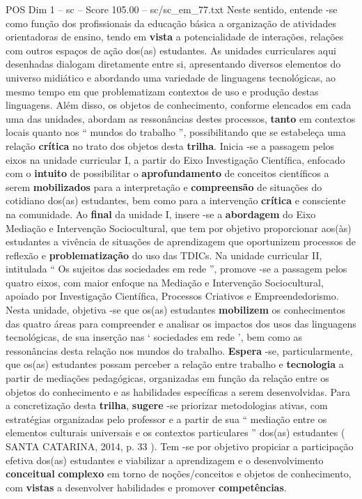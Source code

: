 \begin{textsample}{POS Dim 1 – sc – Score 105.00 – sc/sc\_em\_77.txt}
Neste sentido, entende -se como função dos profissionais da educação básica a organização de atividades orientadoras de ensino, tendo em \textbf{vista} a potencialidade de interações, relações com outros espaços de ação dos(as) estudantes.
As unidades curriculares aqui desenhadas dialogam diretamente entre si, apresentando diversos elementos do universo midiático e abordando uma variedade de linguagens tecnológicas, ao mesmo tempo em que problematizam contextos de uso e produção destas linguagens.
Além disso, os objetos de conhecimento, conforme elencados em cada uma das unidades, abordam as ressonâncias destes processos, \textbf{tanto} em contextos locais quanto nos “ mundos do trabalho ”, possibilitando que se estabeleça uma relação \textbf{crítica} no trato dos objetos desta \textbf{trilha}.
Inicia -se a passagem pelos eixos na unidade curricular I, a partir do Eixo Investigação Científica, enfocado com o \textbf{intuito} de possibilitar o \textbf{aprofundamento} de conceitos científicos a serem \textbf{mobilizados} para a interpretação e \textbf{compreensão} de situações do cotidiano dos(as) estudantes, bem como para a intervenção \textbf{crítica} e consciente na comunidade.
Ao \textbf{final} da unidade I, insere -se a \textbf{abordagem} do Eixo Mediação e Intervenção Sociocultural, que tem por objetivo proporcionar aos(às) estudantes a vivência de situações de aprendizagem que oportunizem processos de reflexão e \textbf{problematização} do uso das TDICs.
Na unidade curricular II, intitulada “ Os sujeitos das sociedades em rede ”, promove -se a passagem pelos quatro eixos, com maior enfoque na Mediação e Intervenção Sociocultural, apoiado por Investigação Científica, Processos Criativos e Empreendedorismo.
Nesta unidade, objetiva -se que os(as) estudantes \textbf{mobilizem} os conhecimentos das quatro áreas para compreender e analisar os impactos dos usos das linguagens tecnológicas, de sua inserção nas ‘ sociedades em rede ’, bem como as ressonâncias desta relação nos mundos do trabalho. \textbf{Espera} -se, particularmente, que os(as) estudantes possam perceber a relação entre trabalho e \textbf{tecnologia} a partir de mediações pedagógicas, organizadas em função da relação entre os objetos do conhecimento e as habilidades específicas a serem desenvolvidas.
Para a concretização desta \textbf{trilha}, \textbf{sugere} -se priorizar metodologias ativas, com estratégias organizadas pelo professor e a partir de sua “ mediação entre os elementos culturais universais e os contextos particulares ” dos(as) estudantes ( SANTA CATARINA, 2014, p. 33 ).
Tem -se por objetivo propiciar a participação efetiva dos(as) estudantes e viabilizar a aprendizagem e o desenvolvimento \textbf{conceitual} \textbf{complexo} em torno de noções/conceitos e objetos de conhecimento, com \textbf{vistas} a desenvolver habilidades e promover \textbf{competências}.

\end{textsample}
